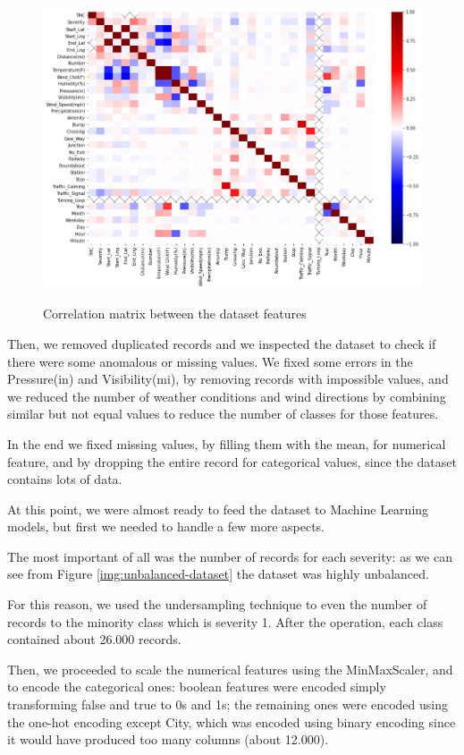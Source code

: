 \documentclass{article}
\begin{document}
\begin{figure}[h]
\centering
\includegraphics[width=\textwidth]{correlation-matrix}
\label{img:corr-matrix}
\caption{Correlation matrix between the dataset features}
\end{figure}

Then, we removed duplicated records and we inspected the dataset to check if there were some anomalous or missing values.
We fixed some errors in the Pressure(in) and Visibility(mi), by removing records with impossible values, and we reduced the number of weather conditions and wind directions by combining similar but not equal values to reduce the number of classes for those features. 

In the end we fixed missing values, by filling them with the mean, for numerical feature, and by dropping the entire record for categorical values, since the dataset contains lots of data.

At this point, we were almost ready to feed the dataset to Machine Learning models, but first we needed to handle a few more aspects.

The most important of all was the number of records for each severity: as we can see from Figure \ref{img:unbalanced-dataset} the dataset was highly unbalanced.

For this reason, we used the undersampling technique to even the number of records to the minority class which is severity 1. After the operation, each class contained about 26.000 records.

Then, we proceeded to scale the numerical features using the MinMaxScaler, and to encode the categorical ones: boolean features were encoded simply transforming false and true to 0s and 1s; the remaining ones were encoded using the one-hot encoding except City, which was encoded using binary encoding since it would have produced too many columns (about 12.000).
\end{document}

